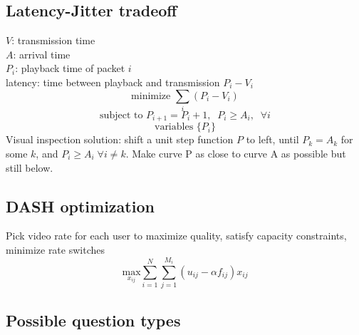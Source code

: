 \documentclass{article}
\newcommand{\MatrixVariable}[1]{\bm{\mathit{#1}}}
\begin{document}
\subsection{Latency-Jitter tradeoff}

$\MatrixVariable{V}$: transmission time \\
$\MatrixVariable{A}$: arrival time \\
$P_i$: playback time of packet $i$ \\
latency: time between playback and transmission $P_i - V_i$
$$ \text{minimize } \sum_i (P_i - V_i) $$
$$ \text{subject to } P_{i+1} = P_i + 1, \;\; P_i \geq A_i, \;\; \forall i $$
$$ \text{variables } \lbrace P_i \rbrace $$
Visual inspection solution: shift a unit step function $P$ to left, until $P_k = A_k$ for some $k$, and $P_i \geq A_i \; \forall i \neq k$. Make curve P as close to curve A as possible but still below.

\subsection{DASH optimization}

Pick video rate for each user to maximize quality, satisfy capacity constraints, minimize rate switches
$$ \underset{x_{ij}}{\text{max}} \sum_{i=1}^N \sum_{j=1}^{M_i} (u_{ij} - \alpha f_{ij}) x_{ij} $$

\subsection{Possible question types}
\end{document}
